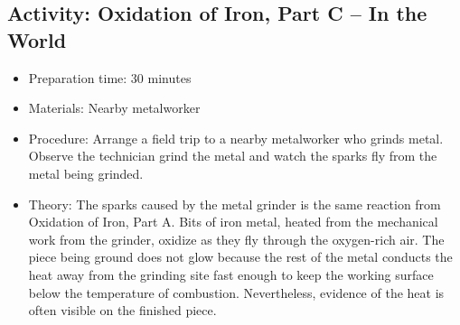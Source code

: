 \begin{itemize}
{\subsection{Activity: Oxidation of Iron, Part C – In the World}
\begin{itemize}
\item{Preparation time: 30 minutes}
\item{Materials: Nearby metalworker}
\item{Procedure: Arrange a field trip to a nearby metalworker who grinds metal. Observe the technician grind the metal and watch the sparks fly from the metal being grinded. }
\item{Theory: The sparks caused by the metal grinder is the same reaction from Oxidation of Iron, Part A. Bits of iron metal, heated from the mechanical work from the grinder, oxidize as they fly through the oxygen-rich air. The piece being ground does not glow because the rest of the metal conducts the heat away from the grinding site fast enough to keep the working surface below the temperature of combustion. Nevertheless, evidence of the heat is often visible on the finished piece.}
\end{itemize}

}
\end{itemize}
